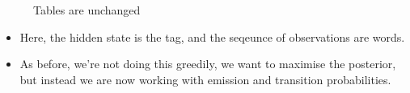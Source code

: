 \documentclass[11pt]{article}
\begin{document}
\begin{figure}[H]
    \centering
    \caption{Tables are unchanged}
\end{figure}    

\begin{minipage}[l]{.5\linewidth}
    \begin{figure}[H]
        \centering
    \end{figure}    
\end{minipage}\hfill
\begin{minipage}[r]{.48\linewidth}
    \begin{itemize}
        \item Here, the hidden state is the tag, and the seqeunce of observations are words. 
        \item As before, we're not doing this greedily, we want to maximise the posterior, but instead we are now working with emission and transition probabilities. 
    \end{itemize}
\end{minipage}
\end{document}
